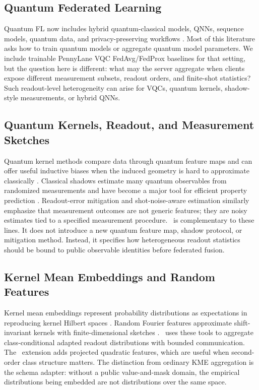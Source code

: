 \subsection{Quantum Federated Learning}

Quantum FL now includes hybrid quantum-classical models, QNNs, sequence models, quantum data, and privacy-preserving workflows \cite{chen2021fqml,xia2021quantumfed,chehimi2022qfl,chehimi2024fedqlstm,innan2024fedqnn,kumar2023privacy,ren2025towardqfl,ballester2025qflreview}. Most of this literature asks how to train quantum models or aggregate quantum model parameters. We include trainable PennyLane VQC FedAvg/FedProx baselines for that setting, but the question here is different: what may the server aggregate when clients expose different measurement subsets, readout orders, and finite-shot statistics? Such readout-level heterogeneity can arise for VQCs, quantum kernels, shadow-style measurements, or hybrid QNNs.

\subsection{Quantum Kernels, Readout, and Measurement Sketches}

Quantum kernel methods compare data through quantum feature maps and can offer useful inductive biases when the induced geometry is hard to approximate classically \cite{havlicek2019supervised,schuld2019feature,huang2021power}. Classical shadows estimate many quantum observables from randomized measurements and have become a major tool for efficient property prediction \cite{huang2020classicalshadows,hadfield2022locallybiased,bu2024pauli}. Readout-error mitigation and shot-noise-aware estimation similarly emphasize that measurement outcomes are not generic features; they are noisy estimates tied to a specified measurement procedure. \method\ is complementary to these lines. It does not introduce a new quantum feature map, shadow protocol, or mitigation method. Instead, it specifies how heterogeneous readout statistics should be bound to public observable identities before federated fusion.

\subsection{Kernel Mean Embeddings and Random Features}

Kernel mean embeddings represent probability distributions as expectations in reproducing kernel Hilbert spaces \cite{smola2007hilbert,gretton2012mmd}. Random Fourier features approximate shift-invariant kernels with finite-dimensional sketches \cite{rahimi2007random}. \method\ uses these tools to aggregate class-conditional adapted readout distributions with bounded communication. The \hopmethod\ extension adds projected quadratic features, which are useful when second-order class structure matters. The distinction from ordinary KME aggregation is the schema adapter: without a public value-and-mask domain, the empirical distributions being embedded are not distributions over the same space.

